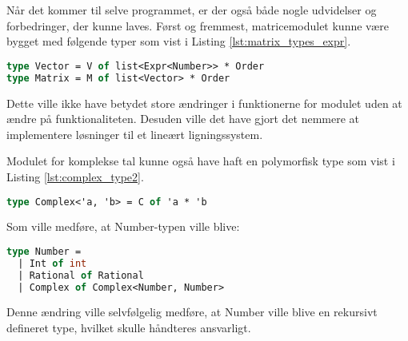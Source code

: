 Når det kommer til selve programmet, er der også både nogle udvidelser og forbedringer, der kunne laves. Først og fremmest, matricemodulet kunne være bygget med følgende typer som vist i Listing \ref{lst:matrix_types_expr}.

\begin{lstlisting}[language={FSharp}, label={lst:matrix_types_expr}, caption={Eksempel på alternative typer for matrixmodulet}]
type Vector = V of list<Expr<Number>> * Order
type Matrix = M of list<Vector> * Order
\end{lstlisting}

Dette ville ikke have betydet store ændringer i funktionerne for modulet uden at ændre på funktionaliteten. Desuden ville det have gjort det nemmere at implementere løsninger til et lineært ligningssystem.

Modulet for komplekse tal kunne også have haft en polymorfisk type som vist i Listing \ref{lst:complex_type2}.

\begin{lstlisting}[language={FSharp}, label={lst:complex_type2}, caption={Eksempel på alternative typer for komplekse tal modulet}]
type Complex<'a, 'b> = C of 'a * 'b
\end{lstlisting}

Som ville medføre, at Number-typen ville blive:

\begin{lstlisting}[language={FSharp}, label={lst:number_type2}, caption={Eksempel på alternative typer for Number-typen}]
type Number = 
  | Int of int 
  | Rational of Rational 
  | Complex of Complex<Number, Number>
\end{lstlisting}

Denne ændring ville selvfølgelig medføre, at Number ville blive en rekursivt defineret type, hvilket skulle håndteres ansvarligt.
